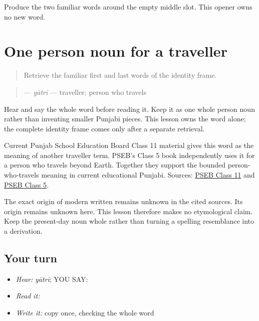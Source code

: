 \begin{tcolorbox}[breakable,colback=teal!4,colframe=teal!35!black,title={Before you move on}]
Produce the two familiar words around the empty middle slot. This opener owns no new word.
\end{tcolorbox}
\section[\texorpdfstring{\pa{ਯਾਤਰੀ} (yaatrii)}{ਯਾਤਰੀ (yaatrii)}]{One person noun for a traveller}

\label{lesson:PA-C202-yatri}



\begin{quote}
Retrieve the familiar first and last words of the identity frame.
\end{quote}

\begin{grammarlens}[title={Grammar Lens: direct owner}]
\begin{quote}
\textbf{} — \emph{yātrī} — traveller; person who travels
\end{quote}

Hear and say the whole word before reading it. Keep it as one whole person noun rather than inventing smaller Punjabi pieces. This lesson owns the word alone; the complete identity frame comes only after a separate retrieval.
\end{grammarlens}

\begin{cousinweb}
Current Punjab School Education Board Class 11 material gives this word as the meaning of another traveller term. PSEB's Class 5 book independently uses it for a person who travels beyond Earth. Together they support the bounded person-who-travels meaning in current educational Punjabi. Sources: \href{https://static.pseb.ac.in/media/1749801072\_11\%20\%20Adhunik\%20Punjabi\%202025.pdf}{PSEB Class 11} and \href{https://static.pseb.ac.in/media/1687845902\_Punjabi\%20Pustak-5\%28Pehli\%20Bhasha\%29.pdf}{PSEB Class 5}.

The exact origin of modern written \textbf{} remains unknown in the cited sources. Its origin remains unknown here. This lesson therefore makes no etymological claim. Keep the present-day noun whole rather than turning a spelling resemblance into a derivation.
\end{cousinweb}

\subsection*{Your turn}
\begin{itemize}
\raggedright
  \item \emph{Hear:} \emph{yātrī}; YOU SAY: \textbf{}
  \item \emph{Read it:} \textbf{}
  \item \emph{Write it:} copy \textbf{} once, checking the whole word
\end{itemize}

